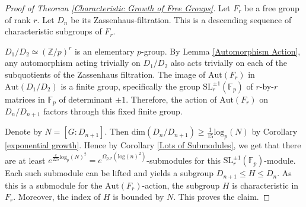 \documentclass[10pt,a4paper]{amsart}
\begin{document}
\setcounter{section}{3}
\setcounter{equation}{0}
\setcounter{theorem}{0}
\begin{proof}[Proof of Theorem \ref{Characteristic Growth of Free Groups}]
Let $F_r$ be a free group of rank $r$. Let $D_n$ be its Zassenhaus-filtration. This is a descending sequence of characteristic subgroups of $F_r$.

$D_1 / D_2 \simeq (\mathbb{Z}/p)^r$ is an elementary $p$-group. By Lemma \ref{Automorphism Action}, any automorphism acting trivially on $D_1 / D_2$ also acts trivially on each of the subquotients of the Zassenhaus filtration.
The image of $\mathrm{Aut}(F_r)$ in $\mathrm{Aut}(D_1/D_2)$ is a finite group, specifically the group $\mathrm{SL}^{\pm1}_r(\mathbb{F}_p)$ of $r$-by-$r$ matrices in $\mathbb{F}_p$ of determinant $\pm 1$. Therefore, the action of $\mathrm{Aut}(F_r)$ on $D_n/D_{n+1}$ factors through this fixed finite group.

Denote by $N = [G : D_{n + 1}]$. Then $\mathrm{dim}(D_n / D_{n + 1}) \geq \frac{1}{15}\mathrm{log}_p(N)$ by Corollary \ref{exponential growth}.
Hence by Corollary \ref{Lots of Submodules}, we get that there are at least $e^{\frac{c}{225}\mathrm{log}_p(N)^2} = e^{\Omega_{p, r}(\mathrm{log}(n)^2)}$-submodules for this $\mathrm{SL}_r^{\pm 1}(\mathbb{F}_p)$-module. Each such submodule can be lifted and yields a subgroup $D_{n + 1} \leq H \leq D_n$. As this is a submodule for the $\mathrm{Aut}(F_r)$-action, the subgroup $H$ is characteristic in $F_r.$ Moreover, the index of $H$ is bounded by $N$. This proves the claim.
\end{proof}
\end{document}
